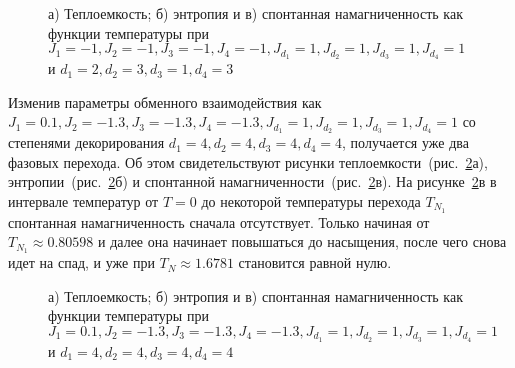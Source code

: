  \begin{figure}[h]
	\begin{minipage}{0.47\linewidth}
	\end{minipage}
	\hfill
	\begin{minipage}{0.47\linewidth}
	\end{minipage}
	\vfill
	\begin{minipage}{0.47\linewidth}
	\end{minipage}
	\caption{а) Теплоемкость; б) энтропия и в) спонтанная намагниченность как функции температуры при $J_1 = -1, J_2 = -1, J_3 = -1, J_4 = -1, J_{d_1} = 1, J_{d_2} = 1, J_{d_3} = 1, J_{d_4} = 1$ и $d_1 = 2, d_2 = 3, d_3 = 1, d_4 = 3$}
	\label{1trans}
\end{figure}

Изменив параметры обменного взаимодействия как $J_1 = 0.1, J_2 = -1.3, J_3 = -1.3, J_4 = -1.3, J_{d_1} = 1, J_{d_2} = 1, J_{d_3} = 1, J_{d_4} = 1$ со степенями декорирования $d_1 = 4, d_2 = 4, d_3 = 4, d_4 = 4$, получается уже два фазовых перехода. Об этом свидетельствуют рисунки теплоемкости~(рис.~\ref{2trans}а), энтропии~(рис.~\ref{2trans}б) и спонтанной намагниченности~(рис.~\ref{2trans}в). На рисунке~\ref{2trans}в в интервале температур от $T = 0$ до некоторой температуры перехода $T_{N_1}$ спонтанная намагниченность сначала отсутствует. Только начиная от $T_{N_1} \approx 0.80598$ и далее она начинает повышаться до насыщения, после чего снова идет на спад, и уже при $T_N \approx 1.6781$ становится равной нулю. 

 \begin{figure}[h]
	\begin{minipage}{0.47\linewidth}
	\end{minipage}
	\hfill
	\begin{minipage}{0.47\linewidth}
	\end{minipage}
	\vfill
		\begin{minipage}{0.47\linewidth}
	\end{minipage}
	\caption{а) Теплоемкость; б) энтропия и в) спонтанная намагниченность как функции температуры при $J_1 = 0.1, J_2 = -1.3, J_3 = -1.3, J_4 = -1.3, J_{d_1} = 1, J_{d_2} = 1, J_{d_3} = 1, J_{d_4} = 1$ и $d_1 = 4, d_2 = 4, d_3 = 4, d_4 = 4$}
	\label{2trans}
\end{figure}

